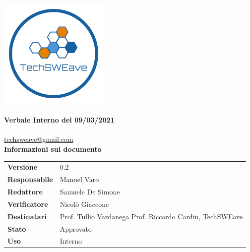 \documentclass{article}
\begin{document}
\begin{titlepage}
    \begin{center}
        \includegraphics{../../../../Images/logo}\\
        \vspace{20px}
        \textcolor{logo}{\hrulefill}\\
        \vspace{20px}
        \textbf{\huge\textcolor{logo}{Verbale Interno del 09/03/2021}}\\
        \vspace{10px}
        \textcolor{logo}{\hrulefill}\\
        \vspace{20px}
        \href{mailto:techsweave@gmail.com}{techsweave@gmail.com}\\
        \vspace{40px}
        \textbf{Informazioni sul documento}\\
        \vspace{20px}
        \begin{tabular}{p{100px} | p{100px}}
            \textbf{Versione} & 0.2\\
            \textbf{Responsabile} & Manuel Varo\\
            \textbf{Redattore} & Samuele De Simone\\
            \textbf{Verificatore} & Nicolò Giaccone\\
            \textbf{Destinatari} & Prof. Tullio Vardanega \newline Prof. Riccardo Cardin, \newline TechSWEave\\
            \textbf{Stato} & Approvato\\
            \textbf{Uso} & Interno\\
        \end{tabular}
            \vspace{1ex}

    \end{center}
    \end{titlepage}
    \tableofcontents
\end{document}
